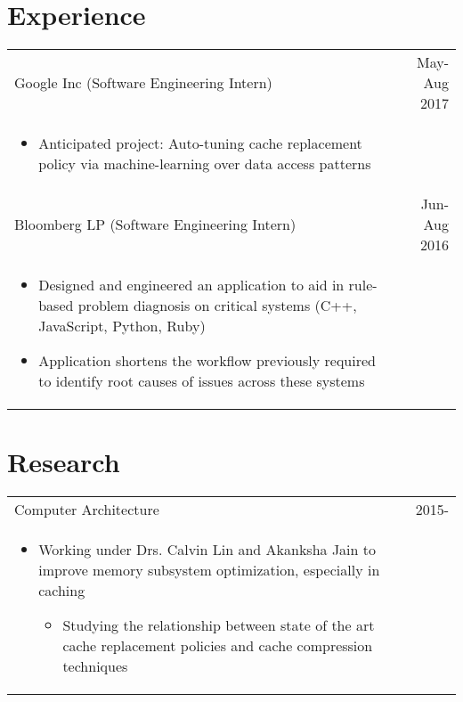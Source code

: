 \documentclass[9pt]{extarticle}
\begin{document}
\section*{Experience}

\begin{tabularx}{\textwidth}{X r }
    Google Inc (Software Engineering Intern) & May-Aug 2017 \\
    \vspace{-2mm}
    \begin{itemize}[noitemsep,topsep=0pt]
        \item Anticipated project: Auto-tuning cache replacement policy via machine-learning over data access patterns
    \end{itemize} & \\
    Bloomberg LP (Software Engineering Intern) & Jun-Aug 2016 \\
    \vspace{-2mm}
    \begin{itemize}[noitemsep,topsep=0pt]
        \item Designed and engineered an application to aid in rule-based problem diagnosis on
                critical systems (C++, JavaScript, Python, Ruby)
        \item Application shortens the workflow previously required to identify root causes of issues
                across these systems
    \end{itemize} & \\
\end{tabularx}

\section*{Research}
\begin{tabularx}{\textwidth}{X r }
    Computer Architecture & 2015- \\
    \vspace{-2mm}
    \begin{itemize}[noitemsep,topsep=0pt]
        \item Working under Drs. Calvin Lin and Akanksha Jain to improve memory
                subsystem optimization, especially in caching
        \begin{itemize}[noitemsep,topsep=0pt]
            \item Studying the relationship between state of the art cache replacement policies and 
                    cache compression techniques
        \end{itemize}
    \end{itemize} & \\
\end{tabularx}
\end{document}
